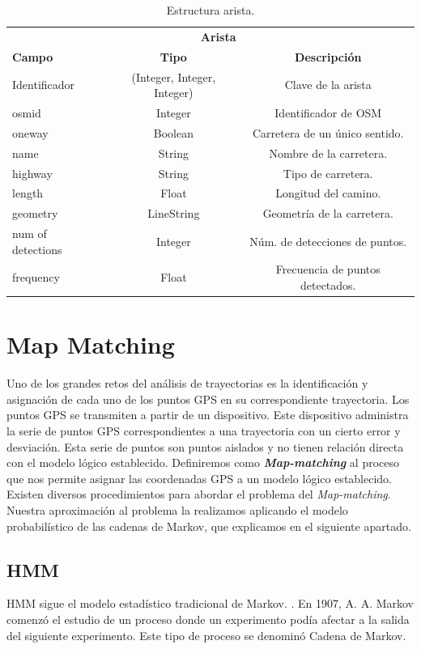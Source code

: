 \begin{table}[h]
\centering
\begin{tabular}{l | c | c } 
\toprule
\multicolumn{2}{r}{\textbf{Arista}} \\ 
\cmidrule(r){1-3}
{\textbf{Campo}} &  {\textbf{Tipo}} & {\textbf{Descripción}} \\
\cmidrule(r){1-3}
{Identificador}  & (Integer, Integer, Integer)  & {Clave de la arista}\\
{osmid}  & Integer  & Identificador de \ac{OSM} \\
{oneway} &  Boolean & Carretera de un único sentido. \\
{name} & String & Nombre de la carretera. \\
{highway} & String & Tipo de carretera. \\
{length} & Float & Longitud del camino. \\
{geometry} & LineString & Geometría de la carretera. \\
{num of detections} & Integer & Núm. de detecciones de puntos. \\
{frequency} & Float & Frecuencia de puntos detectados. \\
\bottomrule
\end{tabular}
\caption{Estructura arista.}
\label{TablaArista}
\end{table}



\section{Map Matching}\label{section: MapMatching}
Uno de los grandes retos del análisis de trayectorias es la identificación y asignación de cada uno de los 
puntos GPS en su correspondiente trayectoria. Los puntos GPS se transmiten a partir de un dispositivo. 
Este dispositivo administra la serie de puntos GPS correspondientes a una trayectoria con un cierto error 
y desviación. Esta serie de puntos son puntos aislados y no tienen relación directa con el modelo lógico 
establecido.
Definiremos como \textbf{\textit{Map-matching}} al proceso que nos permite asignar las coordenadas 
GPS a un modelo lógico establecido.
Existen diversos procedimientos para abordar el problema del \textit{Map-matching}. Nuestra 
aproximación al problema la realizamos aplicando el modelo probabilístico de las cadenas de Markov, 
que explicamos en el siguiente apartado.

\subsection{\ac{HMM}}
\ac{HMM} sigue el modelo estadístico tradicional de Markov. \cite{Malvar08}. En 1907, A. A. Markov 
comenzó el estudio de un proceso donde un experimento podía afectar a la salida del siguiente 
experimento. Este tipo de proceso se denominó Cadena de Markov. 


